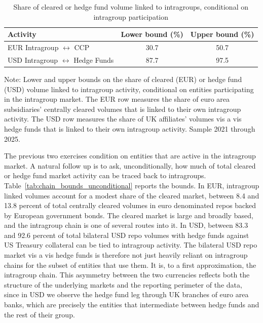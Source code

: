 \documentclass[english, 11pt, oneside, legal]{article}
\begin{document}
\begin{table}[t]
    \centering
    \caption{Share of cleared or hedge fund volume linked to intragroups, conditional on intragroup participation}
    \label{tab:chain_bounds_reverse}
    \begin{tabular}{lcc}
        \hline
        Activity & Lower bound (\%) & Upper bound (\%) \\
        \hline
        EUR Intragroup $\leftrightarrow$ CCP          & 30.7 & 50.7 \\
        USD Intragroup $\leftrightarrow$ Hedge Funds  & 87.7 & 97.5 \\
        \hline
    \end{tabular}
    \begin{flushleft}
        \footnotesize Note: Lower and upper bounds on the share of cleared (EUR) or hedge fund (USD) volume linked to intragroup activity, conditional on entities participating in the intragroup market. The EUR row measures the share of euro area subsidiaries' centrally cleared volumes that is linked to their own intragroup activity. The USD row measures the share of UK affiliates' volumes vis a vis hedge funds that is linked to their own intragroup activity. Sample 2021 through 2025.
    \end{flushleft}
\end{table}

The previous two exercises condition on entities that are active in the intragroup market. A natural follow up is to ask, unconditionally, how much of total cleared or hedge fund market activity can be traced back to intragroups. Table~\ref{tab:chain_bounds_unconditional} reports the bounds. In EUR, intragroup linked volumes account for a modest share of the cleared market, between 8.4 and 13.8 percent of total centrally cleared volumes in euro denominated repos backed by European government bonds. The cleared market is large and broadly based, and the intragroup chain is one of several routes into it. In USD, between 83.3 and 92.6 percent of total bilateral USD repo volumes with hedge funds against US Treasury collateral can be tied to intragroup activity. The bilateral USD repo market vis a vis hedge funds is therefore not just heavily reliant on intragroup chains for the subset of entities that use them. It is, to a first approximation, the intragroup chain. This asymmetry between the two currencies reflects both the structure of the underlying markets and the reporting perimeter of the data, since in USD we observe the hedge fund leg through UK branches of euro area banks, which are precisely the entities that intermediate between hedge funds and the rest of their group.
\end{document}
